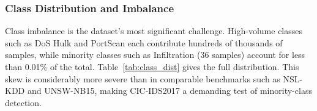 \documentclass[5p,times]{elsarticle}
\begin{document}
	\begin{table}[!htbp]
		\centering
		\caption{Summary of CIC-IDS2017 dataset properties.}
		\label{tab:dataset}
		\renewcommand{\arraystretch}{0.9}
		\setlength{\tabcolsep}{5pt}
	\end{table}
	
	\subsubsection{Class Distribution and Imbalance}
	
	Class imbalance is the dataset's most significant challenge.
	High-volume classes such as DoS Hulk and PortScan each contribute
	hundreds of thousands of samples, while minority classes such as
	Infiltration (36 samples) account for less than 0.01\% of the total.
	Table~\ref{tab:class_dist} gives the full distribution. This skew is
	considerably more severe than in comparable benchmarks such as NSL-KDD
	and UNSW-NB15, making CIC-IDS2017 a demanding test of minority-class
	detection.
	
\end{document}
